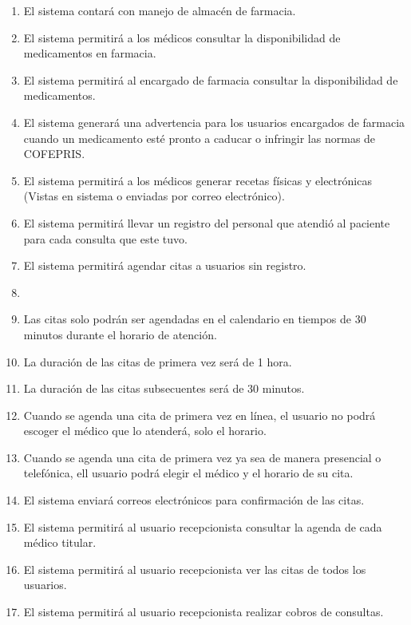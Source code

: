 \documentclass[12pt,letterpaper]{article}
\begin{document}
{{{\begin{itemize}
\begin{enumerate}
                        \item El sistema contará con manejo de almacén de farmacia.
                        \item El sistema permitirá a los médicos consultar la disponibilidad de medicamentos en farmacia.
                        \item El sistema permitirá al encargado de farmacia consultar la disponibilidad de medicamentos.
                        \item El sistema generará una advertencia para los usuarios encargados de farmacia cuando un medicamento esté pronto a caducar o infringir las normas de COFEPRIS.
                        \item El sistema permitirá a los médicos generar recetas físicas y electrónicas (Vistas en sistema o enviadas por correo electrónico).
                        \item El sistema permitirá llevar un registro del personal que atendió al paciente para cada consulta que este tuvo.
                        \item El sistema permitirá agendar citas a usuarios sin registro.
                        \item \item Las citas solo podrán ser agendadas en el calendario en tiempos de 30 minutos durante el horario de atención.
                        \item La duración de las citas de primera vez será de 1 hora.
                        \item La duración de las citas  subsecuentes será de 30 minutos.
                        \item Cuando se agenda una cita de primera vez en línea, el usuario no podrá escoger el médico que lo atenderá, solo el horario.
                        \item Cuando se agenda una cita de primera vez ya sea de manera presencial o telefónica, ell usuario podrá elegir el médico y el horario de su cita.
                        \item El sistema enviará correos electrónicos para confirmación de las citas.
                        \item El sistema permitirá al usuario recepcionista consultar la agenda de cada médico titular.
                        \item El sistema permitirá al usuario recepcionista ver las citas de todos los usuarios.
                        \item El sistema permitirá al usuario recepcionista realizar cobros de consultas.

\end{enumerate}
\end{itemize}}}}
\end{document}
